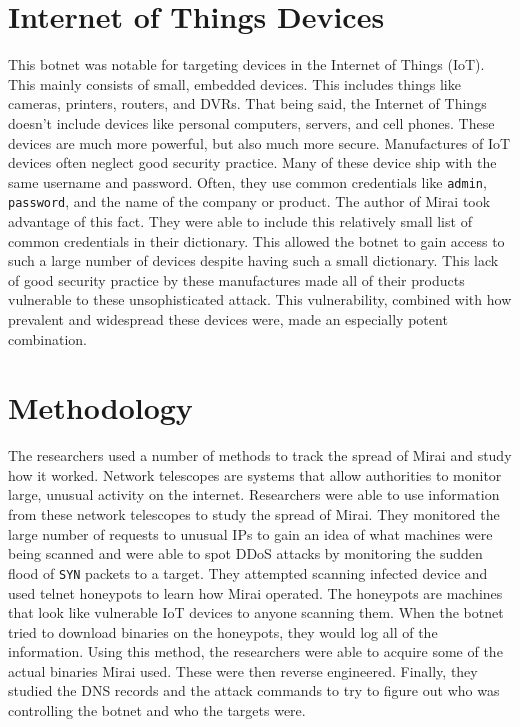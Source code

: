 \documentclass[conference]{IEEEtran}
\begin{document}
\section{Internet of Things Devices}

This botnet was notable for targeting devices in the Internet of Things (IoT). This mainly consists of small, embedded devices. This includes things like cameras, printers, routers, and DVRs. That being said, the Internet of Things doesn't include devices like personal computers, servers, and cell phones. These devices are much more powerful, but also much more secure. Manufactures of IoT devices often neglect good security practice. Many of these device ship with the same username and password. Often, they use common credentials like \verb|admin|, \verb|password|, and the name of the company or product. The author of Mirai took advantage of this fact. They were able to include this relatively small list of common credentials in their dictionary. This allowed the botnet to gain access to such a large number of devices despite having such a small dictionary. This lack of good security practice by these manufactures made all of their products vulnerable to these unsophisticated attack. This vulnerability, combined with how prevalent and widespread these devices were, made an especially potent combination.

\section{Methodology}

The researchers used a number of methods to track the spread of Mirai and study how it worked. Network telescopes are systems that allow authorities to monitor large, unusual activity on the internet. Researchers were able to use information from these network telescopes to study the spread of Mirai. They monitored the large number of requests to unusual IPs to gain an idea of what machines were being scanned and were able to spot DDoS attacks by monitoring the sudden flood of \verb|SYN| packets to a target. They attempted scanning infected device and used telnet honeypots to learn how Mirai operated. The honeypots are machines that look like vulnerable IoT devices to anyone scanning them. When the botnet tried to download binaries on the honeypots, they would log all of the information. Using this method, the researchers were able to acquire some of the actual binaries Mirai used. These were then reverse engineered. Finally, they studied the DNS records and the attack commands to try to figure out who was controlling the botnet and who the targets were.
\end{document}
